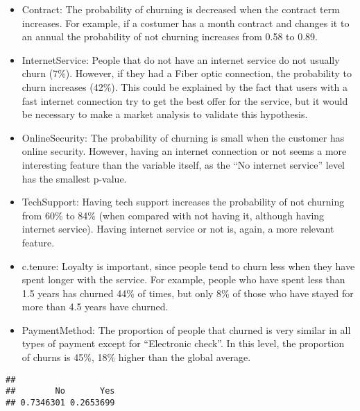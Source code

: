 \documentclass[
]{article}
\newenvironment{Shaded}{\begin{snugshade}}{\end{snugshade}}
\newcommand{\CommentTok}[1]{\textcolor[rgb]{0.56,0.35,0.01}{\textit{#1}}}
\newcommand{\FunctionTok}[1]{\textcolor[rgb]{0.13,0.29,0.53}{\textbf{#1}}}
\newcommand{\NormalTok}[1]{#1}
\newcommand{\SpecialCharTok}[1]{\textcolor[rgb]{0.81,0.36,0.00}{\textbf{#1}}}
\begin{document}
\begin{itemize}
\item
  Contract: The probability of churning is decreased when the contract
  term increases. For example, if a costumer has a month contract and
  changes it to an annual the probability of not churning increases from
  0.58 to 0.89.
\item
  InternetService: People that do not have an internet service do not
  usually churn (7\%). However, if they had a Fiber optic connection,
  the probability to churn increases (42\%). This could be explained by
  the fact that users with a fast internet connection try to get the
  best offer for the service, but it would be necessary to make a market
  analysis to validate this hypothesis.
\item
  OnlineSecurity: The probability of churning is small when the customer
  has online security. However, having an internet connection or not
  seems a more interesting feature than the variable itself, as the ``No
  internet service'' level has the smallest p-value.
\item
  TechSupport: Having tech support increases the probability of not
  churning from 60\% to 84\% (when compared with not having it, although
  having internet service). Having internet service or not is, again, a
  more relevant feature.
\item
  c.tenure: Loyalty is important, since people tend to churn less when
  they have spent longer with the service. For example, people who have
  spent less than 1.5 years has churned 44\% of times, but only 8\% of
  those who have stayed for more than 4.5 years have churned.
\item
  PaymentMethod: The proportion of people that churned is very similar
  in all types of payment except for ``Electronic check''. In this
  level, the proportion of churns is 45\%, 18\% higher than the global
  average.
\end{itemize}

\begin{Shaded}
\end{Shaded}

\begin{verbatim}
## 
##        No       Yes 
## 0.7346301 0.2653699
\end{verbatim}
\end{document}
